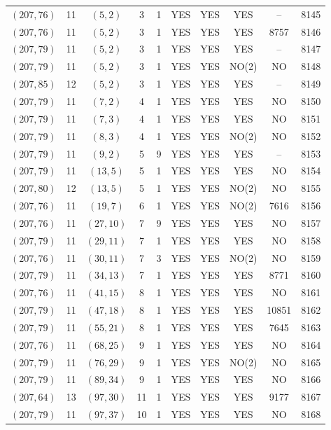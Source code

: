\begin{longtable}{|c|c|c|c|c|c|c|c|c|c|}
$(207, 76)$ & 11 & $(5, 2)$ & 3 & 1 & YES & YES & YES & -- & 8145\\
$(207, 76)$ & 11 & $(5, 2)$ & 3 & 1 & YES & YES & YES & 8757 & 8146\\
$(207, 79)$ & 11 & $(5, 2)$ & 3 & 1 & YES & YES & YES & -- & 8147\\
$(207, 79)$ & 11 & $(5, 2)$ & 3 & 1 & YES & YES & NO(2) & NO & 8148\\
$(207, 85)$ & 12 & $(5, 2)$ & 3 & 1 & YES & YES & YES & -- & 8149\\
$(207, 79)$ & 11 & $(7, 2)$ & 4 & 1 & YES & YES & YES & NO & 8150\\
$(207, 79)$ & 11 & $(7, 3)$ & 4 & 1 & YES & YES & YES & NO & 8151\\
$(207, 79)$ & 11 & $(8, 3)$ & 4 & 1 & YES & YES & NO(2) & NO & 8152\\
$(207, 79)$ & 11 & $(9, 2)$ & 5 & 9 & YES & YES & YES & -- & 8153\\
$(207, 79)$ & 11 & $(13, 5)$ & 5 & 1 & YES & YES & YES & NO & 8154\\
$(207, 80)$ & 12 & $(13, 5)$ & 5 & 1 & YES & YES & NO(2) & NO & 8155\\
$(207, 76)$ & 11 & $(19, 7)$ & 6 & 1 & YES & YES & NO(2) & 7616 & 8156\\
$(207, 76)$ & 11 & $(27, 10)$ & 7 & 9 & YES & YES & YES & NO & 8157\\
$(207, 79)$ & 11 & $(29, 11)$ & 7 & 1 & YES & YES & YES & NO & 8158\\
$(207, 76)$ & 11 & $(30, 11)$ & 7 & 3 & YES & YES & NO(2) & NO & 8159\\
$(207, 79)$ & 11 & $(34, 13)$ & 7 & 1 & YES & YES & YES & 8771 & 8160\\
$(207, 76)$ & 11 & $(41, 15)$ & 8 & 1 & YES & YES & YES & NO & 8161\\
$(207, 79)$ & 11 & $(47, 18)$ & 8 & 1 & YES & YES & YES & 10851 & 8162\\
$(207, 79)$ & 11 & $(55, 21)$ & 8 & 1 & YES & YES & YES & 7645 & 8163\\
$(207, 76)$ & 11 & $(68, 25)$ & 9 & 1 & YES & YES & YES & NO & 8164\\
$(207, 79)$ & 11 & $(76, 29)$ & 9 & 1 & YES & YES & NO(2) & NO & 8165\\
$(207, 79)$ & 11 & $(89, 34)$ & 9 & 1 & YES & YES & YES & NO & 8166\\
$(207, 64)$ & 13 & $(97, 30)$ & 11 & 1 & YES & YES & YES & 9177 & 8167\\
$(207, 79)$ & 11 & $(97, 37)$ & 10 & 1 & YES & YES & YES & NO & 8168\\

\end{longtable}

